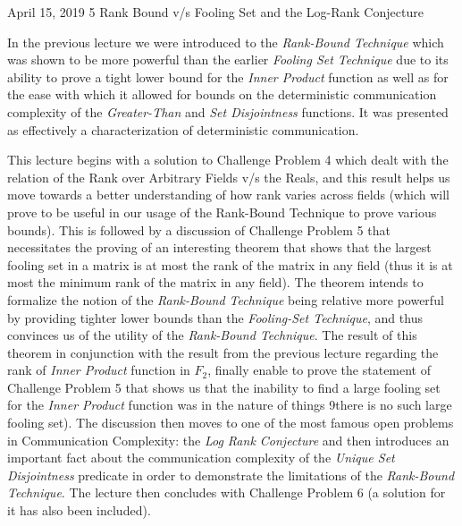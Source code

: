 \documentclass[usletter]{article}
\begin{document}
           {April 15, 2019}                   %
           {5}                                       %
           {Rank Bound v/s Fooling Set and the Log-Rank Conjecture}  %

\noindent
In the previous lecture we were introduced to the \emph{Rank-Bound Technique} which was shown to be more powerful than the earlier \emph {Fooling Set Technique} due to its ability to prove a tight lower bound for the \emph{Inner Product} function as well as for the ease with which it allowed for bounds on the deterministic communication complexity of the \emph{Greater-Than} and \emph {Set Disjointness} functions. It was presented as effectively a characterization of deterministic communication. \newline

This lecture begins with a solution to Challenge Problem 4 which dealt with the relation of the Rank over Arbitrary Fields v/s the Reals, and this result helps us move towards a better understanding of how rank varies across fields (which will prove to be useful in our usage of the Rank-Bound Technique to prove various bounds). This is followed by a discussion of Challenge Problem 5 that necessitates the proving of an interesting theorem that shows that the largest fooling set in a matrix is at most the rank of the matrix in any field (thus it is at most the minimum rank of the matrix in any field). The theorem intends to formalize the notion of the \emph {Rank-Bound Technique} being relative more powerful by providing tighter lower bounds than the \emph {Fooling-Set Technique}, and thus convinces us of the utility of the \emph {Rank-Bound Technique}. The result of this theorem in conjunction with the result from the previous lecture regarding the rank of \emph {Inner Product} function in $F_2$, finally enable to prove the statement of Challenge Problem 5 that shows us that the inability to find a large fooling set for the \emph {Inner Product} function was in the nature of things 9there is no such large fooling set). The discussion then moves to one of the most famous open problems in Communication Complexity: the \emph {Log Rank Conjecture} and then introduces an important fact about the communication complexity of the \emph {Unique Set Disjointness} predicate in order to demonstrate the limitations of the \emph {Rank-Bound Technique}. The lecture then concludes with Challenge Problem 6 (a solution for it has also been included). 
\end{document}

